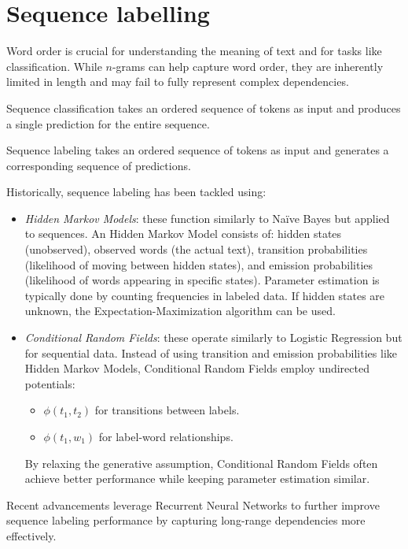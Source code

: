 \section{Sequence labelling}

Word order is crucial for understanding the meaning of text and for tasks like classification. 
While $n$-grams can help capture word order, they are inherently limited in length and may fail to fully represent complex dependencies.

\begin{definition}
    Sequence classification takes an ordered sequence of tokens as input and produces a single prediction for the entire sequence.
\end{definition}

\begin{definition}
    Sequence labeling takes an ordered sequence of tokens as input and generates a corresponding sequence of predictions.
\end{definition}

Historically, sequence labeling has been tackled using:
\begin{itemize}
    \item \textit{Hidden Markov Models}: these function similarly to Naïve Bayes but applied to sequences. 
        An Hidden Markov Model consists of: hidden states (unobserved), observed words (the actual text), transition probabilities (likelihood of moving between hidden states), and emission probabilities (likelihood of words appearing in specific states).
        Parameter estimation is typically done by counting frequencies in labeled data. 
        If hidden states are unknown, the Expectation-Maximization algorithm can be used.
    \item \textit{Conditional Random Fields}: these operate similarly to Logistic Regression but for sequential data. 
        Instead of using transition and emission probabilities like Hidden Markov Models, Conditional Random Fields employ undirected potentials:
        \begin{itemize}
            \item $\phi(t_1,t_2)$ for transitions between labels. 
            \item $\phi(t_1,w_1)$ for label-word relationships.
        \end{itemize}
        By relaxing the generative assumption, Conditional Random Fields often achieve better performance while keeping parameter estimation similar.
\end{itemize}
\noindent Recent advancements leverage Recurrent Neural Networks to further improve sequence labeling performance by capturing long-range dependencies more effectively.

